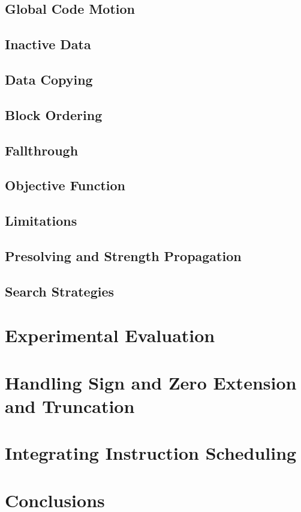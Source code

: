 \documentclass{book}
\begin{document}
\section{Global Code Motion}
\section{Inactive Data}
\section{Data Copying}
\section{Block Ordering}
\section{Fallthrough}
\section{Objective Function}
\section{Limitations}
\section{Presolving and Strength Propagation}
\section{Search Strategies}

\chapter{Experimental Evaluation}

\chapter{Handling Sign and Zero Extension and Truncation}

\chapter{Integrating Instruction Scheduling}

\chapter{Conclusions}
\end{document}
